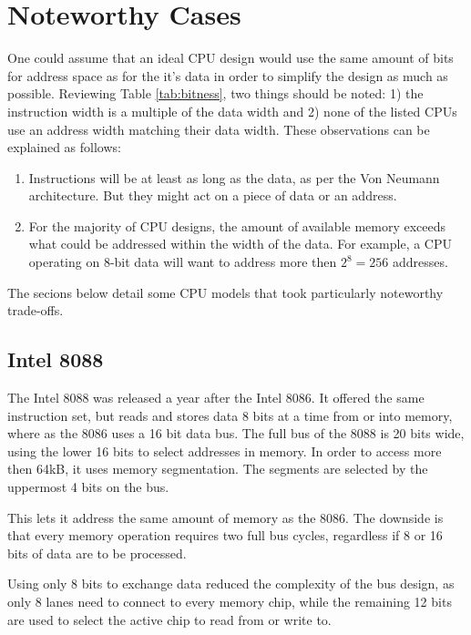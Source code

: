 \documentclass[twoside,twocolumn]{article}
\begin{document}

\section{Noteworthy Cases}

One could assume that an ideal CPU design would use the same amount of bits for address
space as for the it's data in order to simplify the design as much as possible. Reviewing
Table \ref{tab:bitness}, two things should be noted: 1) the instruction width is a
multiple of the data width and 2) none of the listed CPUs use an address width matching
their data width. These observations can be explained as follows:

\begin{enumerate}[1)]
\item Instructions will be at least as long as the data, as per the Von Neumann
architecture. But they might act on a piece of data or an address.
\item For the majority of CPU designs, the amount of available memory exceeds what could
be addressed within the width of the data. For example, a CPU operating on 8-bit data
will want to address more then $2^8 = 256$ addresses.
\end{enumerate}

The secions below detail some CPU models that took particularly noteworthy trade-offs.

\subsection{Intel 8088}

The Intel 8088 was released a year after the Intel 8086. It offered the same instruction
set, but reads and stores data 8 bits at a time from or into memory, where as the 8086
uses a 16 bit data bus. The full bus of the 8088 is 20 bits wide, using the lower 16 bits
to select addresses in memory. In order to access more then 64kB, it uses memory
segmentation. The segments are selected by the uppermost 4 bits on the bus.

This lets it address the same amount of memory as the 8086. The downside is that every
memory operation requires two full bus cycles, regardless if 8 or 16 bits of data are
to be processed.

Using only 8 bits to exchange data reduced the complexity of the bus design, as only 8
lanes need to connect to every memory chip, while the remaining 12 bits are used to
select the active chip to read from or write to.
\end{document}
